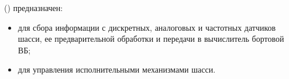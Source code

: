 
\point {\nameDevice} ({\nameDeviceAbbr}) предназначен:
  \begin{itemize}
    \item для сбора информации с дискретных, аналоговых и частотных
      датчиков шасси, ее предварительной обработки и передачи в 
      вычислитель бортовой ВБ;
    \item для управления исполнительными механизмами шасси.
  \end{itemize}
